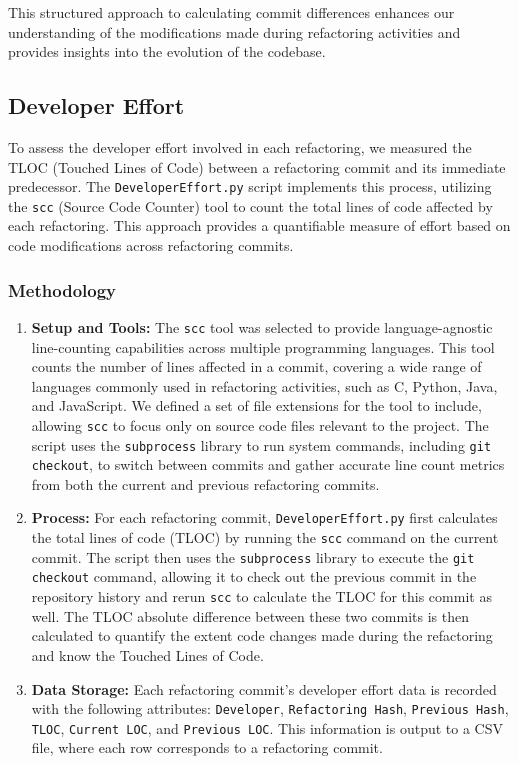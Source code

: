 \documentclass[sigconf]{acmart}
\begin{document}
This structured approach to calculating commit differences enhances our understanding of the modifications made during refactoring activities and provides insights into the evolution of the codebase.


\subsection{Developer Effort}
To assess the developer effort involved in each refactoring, we measured the TLOC (Touched Lines of Code) between a refactoring commit and its immediate predecessor. The \texttt{DeveloperEffort.py} script implements this process, utilizing the \texttt{scc} (Source Code Counter) tool to count the total lines of code affected by each refactoring. This approach provides a quantifiable measure of effort based on code modifications across refactoring commits.

\subsubsection{Methodology}
\begin{enumerate}
    \item \textbf{Setup and Tools:} The \texttt{scc} tool was selected to provide language-agnostic line-counting capabilities across multiple programming languages. This tool counts the number of lines affected in a commit, covering a wide range of languages commonly used in refactoring activities, such as C, Python, Java, and JavaScript. We defined a set of file extensions for the tool to include, allowing \texttt{scc} to focus only on source code files relevant to the project. The script uses the \texttt{subprocess} library to run system commands, including \texttt{git checkout}, to switch between commits and gather accurate line count metrics from both the current and previous refactoring commits.

    \item \textbf{Process:} For each refactoring commit, \texttt{DeveloperEffort.py} first calculates the total lines of code (TLOC) by running the \texttt{scc} command on the current commit. The script then uses the \texttt{subprocess} library to execute the \texttt{git checkout} command, allowing it to check out the previous commit in the repository history and rerun \texttt{scc} to calculate the TLOC for this commit as well. The TLOC absolute difference between these two commits is then calculated to quantify the extent code changes made during the refactoring and know the Touched Lines of Code.

    \item \textbf{Data Storage:} Each refactoring commit’s developer effort data is recorded with the following attributes: \texttt{Developer}, \texttt{Refactoring Hash}, \texttt{Previous Hash}, \texttt{TLOC}, \texttt{Current LOC}, and \texttt{Previous LOC}. This information is output to a CSV file, where each row corresponds to a refactoring commit.
\end{enumerate}
\end{document}
